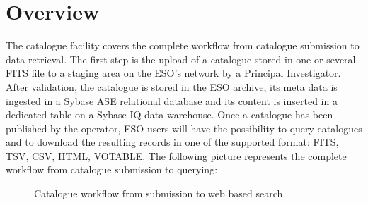 \section{Overview}
The catalogue facility covers the complete workflow from catalogue submission to data retrieval. The first step is the upload of a catalogue stored in one or several FITS file to a staging area on the ESO's network by a Principal Investigator. After validation, the catalogue is stored in the ESO archive, its meta data is ingested in a Sybase ASE relational database and its content is inserted in a dedicated table on a Sybase IQ data warehouse. Once a catalogue has been published by the operator, ESO users will have the possibility to query catalogues and to download the resulting records in one of the supported format: FITS, TSV, CSV, HTML, VOTABLE. The following picture represents the complete workflow from catalogue submission to querying:
\begin{center}
\setlength\fboxsep{1pt}
\setlength\fboxrule{1pt}
\begin{figure}[h]
\caption{Catalogue workflow from submission to web based search}
\end{figure}
\end{center}

